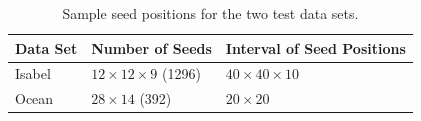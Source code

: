 \begin{table}[ht!b]
\centering
\begin{tabular}{|l|l|l|}
\hline
Data Set & Number of Seeds                 & Interval of Seed Positions  \\ \hline
Isabel   & $12 \times 12 \times 9$ (1296)  & $40 \times 40 \times 10$    \\ \hline
Ocean    & $28 \times 14$ (392)            & $20 \times 20$              \\ \hline
\end{tabular}
\caption{Sample seed positions for the two test data sets.}
\label{seed_position}
\end{table}



